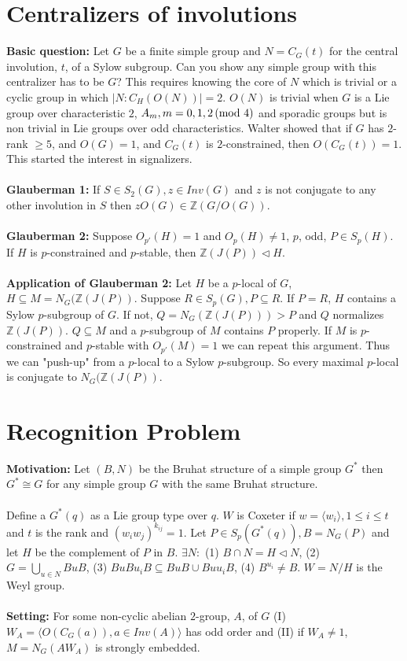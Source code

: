 \section{Centralizers of involutions}
{\bf Basic question:} Let $G$ be a finite simple group and $N=C_G(t)$ for the central
involution, $t$, of a Sylow subgroup.  Can you show any simple group with this centralizer
has to be $G$?  This requires knowing the core of $N$ which is trivial or a cyclic group
in which $|N:C_H(O(N))|=2$.  $O(N)$ is trivial when $G$ is a Lie group over characteristic $2$,
$A_m, m = 0, 1,2 \thinspace \textnormal{(mod } 4 \textnormal{)}$ and sporadic groups but is non trivial in Lie groups over
odd characteristics.  Walter showed that if $G$ has $2$-rank $\geq 5$, and $O(G)=1$,
and $C_G(t)$ is $2$-constrained, then $O(C_G(t)) = 1$.  This started the interest in
signalizers.
\\
\\
{\bf Glauberman 1:} If $S \in S_2(G), z \in Inv(G)$ and $z$ is not conjugate to any other involution
in $S$ then $zO(G) \in {\mathbb Z}(G/O(G))$.
\\
\\
{\bf Glauberman 2:} Suppose $O_{p'}(H)=1$ and $O_p(H) \ne 1$, $p$, odd, $P \in S_p(H)$.
If $H$ is $p$-constrained and $p$-stable, then ${\mathbb Z}(J(P)) \lhd H$.
\\
\\
{\bf Application of Glauberman 2:} Let $H$ be a $p$-local of $G$,
$H \subseteq M = N_G({\mathbb Z}(J(P))$.  Suppose $R \in S_p(G), P \subseteq R$.
If $P=R$, $H$ contains a Sylow $p$-subgroup of $G$.  If not, $Q=N_G({\mathbb Z}(J(P))) > P$ and
$Q$ normalizes ${\mathbb Z}(J(P))$.  $Q \subseteq M$ and a $p$-subgroup of $M$ contains
$P$ properly.  If $M$ is $p$-constrained and $p$-stable with $O_{p'}(M)=1$ we can repeat this
argument.  Thus we can "push-up" from a $p$-local to a Sylow $p$-subgroup.
So every maximal $p$-local is conjugate to $ N_G({\mathbb Z}(J(P))$.
\section{Recognition Problem}
{\bf Motivation:} Let $(B,N)$ be the Bruhat structure of a simple group $G^*$ then
$G^* \cong G$ for any simple group $G$ with the same Bruhat structure.
\\
\\
Define a $G^*(q)$ as a Lie group type over $q$.  $W$ is Coxeter if $w = \langle w_i \rangle, 1 \leq i \leq t$ and
$t$ is the rank  and $(w_i w_j)^{k_{ij}} =1$.  Let $P \in S_p(G^*(q)), B= N_G(P)$ and let $H$
be the complement of $P$ in $B$. $\exists N:$
(1) $B \cap N = H \lhd N$, (2) $G = \bigcup_{u \in N} BuB$,
(3) $BuBu_iB \subseteq BuB \cup Buu_iB$,
(4) $B^{u_i} \ne B$. $W = N/H$ is the Weyl group.
\\
\\
{\bf Setting:} For some non-cyclic abelian $2$-group, $A$, of $G$
(I) $W_A = \langle O(C_G(a)), a \in Inv(A) \rangle$ has odd order and (II)
if $W_A \ne 1$, $M=N_G(AW_A)$ is strongly embedded.

